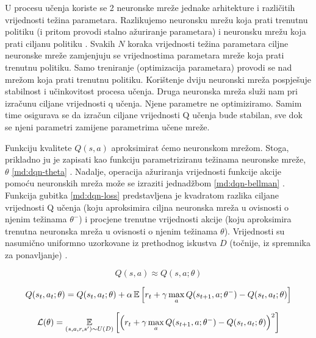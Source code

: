 U procesu učenja koriste se 2 neuronske mreže jednake arhitekture i različitih vrijednosti težina parametara. Razlikujemo neuronsku mrežu koja prati trenutnu politiku (i pritom provodi stalno ažuriranje parametara)  i neuronsku mrežu koja prati ciljanu politiku . Svakih $N$ koraka vrijednosti težina parametara ciljne neuronske mreže zamjenjuju se vrijednostima parametara mreže koja prati trenutnu politiku. Samo treniranje (optimizacija parametara) provodi se nad mrežom koja prati trenutnu politiku. Korištenje dviju neuronski mreža pospješuje stabilnost i učinkovitost procesa učenja. Druga neuronska mreža služi nam pri izračunu ciljane vrijednosti q učenja. Njene parametre ne optimiziramo. Samim time osigurava se da izračun ciljane vrijednosti Q učenja bude stabilan, sve dok se njeni parametri zamijene parametrima učene mreže.

Funkciju kvalitete $Q(s, a)$ aproksimirat ćemo neuronskom mrežom. Stoga, prikladno ju je zapisati kao funkciju parametriziranu težinama neuronske mreže, $\theta$ \ref{md:dqn-theta} \cite{BruntonYoutube}. Nadalje, operacija ažuriranja vrijednosti funkcije akcije pomoću neuronskih mreža može se izraziti jednadžbom \ref{md:dqn-bellman} \cite{DQN-MlAi}. Funkcija gubitka \ref{md:dqn-loss} predstavljena je kvadratom razlika ciljane vrijednosti Q učenja (koju aproksimira ciljna neuronska mreža u ovisnosti o njenim težinama $\theta^-$) i procjene trenutne vrijednosti akcije (koju aproksimira trenutna neuronska mreža u ovisnosti o njenim težinama $\theta$). Vrijednosti su nasumično uniformno uzorkovane iz prethodnog iskustva $D$ (točnije, iz spremnika za ponavljanje) \cite{DQN-MlAi}.

\begin{equation}
    \label{md:dqn-theta}
    Q(s, a) \approx Q(s, a; \theta)
\end{equation}

\begin{equation}
    \label{md:dqn-bellman}
    Q(s_t, a_t; \theta) = Q(s_t, a_t; \theta) + \alpha \operatorname*{\mathbb{E}} \left[ r_t + \gamma \max_a Q(s_{t+1}, a; \theta^-) - Q(s_t, a_t; \theta) \right]
\end{equation}

\begin{equation}
    \label{md:dqn-loss}
    \mathcal{L}(\theta) = \operatorname*{\mathbb{E}}_{(s,a,r,s') \sim U(D)} \left[ \left( r_t + \gamma \max_a Q(s_{t+1}, a; \theta^-) - Q(s_t, a_t; \theta) \right)^2 \right]
\end{equation}

